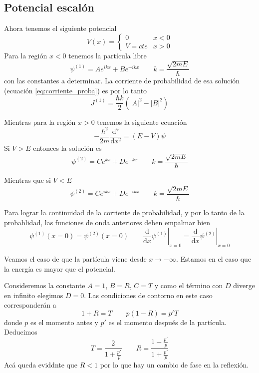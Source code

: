 \documentclass{book}
\numberwithin{equation}{section} %
\begin{document}
\subsection{Potencial escalón}

Ahora tenemos el siguiente potencial
\begin{equation}
V(x) = \begin{cases} 0 & x < 0 \\ V = cte & x > 0 \end{cases}
\end{equation}
Para la región $x < 0$ tenemos la partícula libre
\begin{equation}
    \psi^{(1)} = A e^{i k x} + B e^{- i k x} \qquad k = \frac{\sqrt{2 m E}}{\hbar}
\end{equation}
con las constantes a determinar.
La corriente de probabilidad de esa solución (ecuación \ref{eq:corriente_proba}) es por lo tanto
\begin{equation}
    J^{(1)} = \frac{\hbar k}{2} (|A|^2 - |B|^2)
\end{equation}

Mientras para la región $x > 0$ tenemos la siguiente ecuación
\begin{equation}
    -\frac{\hbar^2}{2m} \frac{\mathrm{d}^ \psi}{\mathrm{d}x^2} = (E - V) \psi
\end{equation}
Si $V > E$ entonces la solución es
\begin{equation}
    \psi^{(2)} = C e^{k x} + D e^{-k x} \qquad k = \frac{\sqrt{2 m E}}{\hbar}
\end{equation}

Mientras que si $V < E$
\begin{equation}
    \psi^{(2)} = C e^{i k x} + D e^{-i k x} \qquad k = \frac{\sqrt{2 m E}}{\hbar}
\end{equation}

Para lograr la continuidad de la corriente de probabilidad, y por lo tanto de la probablidad, las funciones de onda anteriores deben empalmar bien
\begin{equation}
    \psi^{(1)}(x = 0) = \psi^{(2)}(x = 0) \qquad \left.\frac{\mathrm{d}}{\mathrm{d}x} \psi^{(1)}\right|_{x = 0} = \left.\frac{\mathrm{d}}{\mathrm{d}x} \psi^{(2)}\right|_{x = 0} 
\end{equation}

Veamos el caso de que la partícula viene desde $x \to - \infty$.
Estamos en el caso que la energía es mayor que el potencial.

Consideremos la constante $A = 1$, $B = R$, $C = T$ y como el término con $D$ diverge en infinito elegimos $D = 0$.
Las condiciones de contorno en este caso corresponderán a
\begin{equation}
    1 + R = T \qquad p (1 - R) = p' T
\end{equation}
donde $p$ es el momento antes y $p'$ es el momento después de la partícula.
Deducimos
\begin{equation}
    T = \frac{2}{1 + \frac{p'}{p}} \qquad R = \frac{1 - \frac{p'}{p}}{1 + \frac{p'}{p}}
\end{equation}
Acá queda eviddnte que $R < 1$ por lo que hay un cambio de fase en la reflexión.
\end{document}

